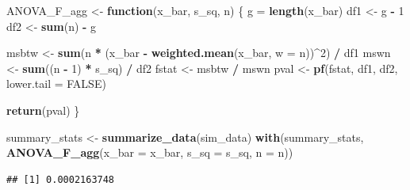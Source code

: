 \documentclass[
]{book}
\newenvironment{Shaded}{\begin{snugshade}}{\end{snugshade}}
\newcommand{\AttributeTok}[1]{\textcolor[rgb]{0.13,0.29,0.53}{#1}}
\newcommand{\ConstantTok}[1]{\textcolor[rgb]{0.56,0.35,0.01}{#1}}
\newcommand{\ControlFlowTok}[1]{\textcolor[rgb]{0.13,0.29,0.53}{\textbf{#1}}}
\newcommand{\DecValTok}[1]{\textcolor[rgb]{0.00,0.00,0.81}{#1}}
\newcommand{\FunctionTok}[1]{\textcolor[rgb]{0.13,0.29,0.53}{\textbf{#1}}}
\newcommand{\NormalTok}[1]{#1}
\newcommand{\OtherTok}[1]{\textcolor[rgb]{0.56,0.35,0.01}{#1}}
\newcommand{\SpecialCharTok}[1]{\textcolor[rgb]{0.81,0.36,0.00}{\textbf{#1}}}
\begin{document}
\begin{Shaded}
\begin{Highlighting}[]
\NormalTok{ANOVA\_F\_agg }\OtherTok{\textless{}{-}} \ControlFlowTok{function}\NormalTok{(x\_bar, s\_sq, n) \{}
\NormalTok{  g }\OtherTok{=} \FunctionTok{length}\NormalTok{(x\_bar)}
\NormalTok{  df1 }\OtherTok{\textless{}{-}}\NormalTok{ g }\SpecialCharTok{{-}} \DecValTok{1}
\NormalTok{  df2 }\OtherTok{\textless{}{-}} \FunctionTok{sum}\NormalTok{(n) }\SpecialCharTok{{-}}\NormalTok{ g}
  
\NormalTok{  msbtw }\OtherTok{\textless{}{-}} \FunctionTok{sum}\NormalTok{(n }\SpecialCharTok{*}\NormalTok{ (x\_bar }\SpecialCharTok{{-}} \FunctionTok{weighted.mean}\NormalTok{(x\_bar, }\AttributeTok{w =}\NormalTok{ n))}\SpecialCharTok{\^{}}\DecValTok{2}\NormalTok{) }\SpecialCharTok{/}\NormalTok{ df1}
\NormalTok{  mswn }\OtherTok{\textless{}{-}} \FunctionTok{sum}\NormalTok{((n }\SpecialCharTok{{-}} \DecValTok{1}\NormalTok{) }\SpecialCharTok{*}\NormalTok{ s\_sq) }\SpecialCharTok{/}\NormalTok{ df2}
\NormalTok{  fstat }\OtherTok{\textless{}{-}}\NormalTok{ msbtw }\SpecialCharTok{/}\NormalTok{ mswn}
\NormalTok{  pval }\OtherTok{\textless{}{-}} \FunctionTok{pf}\NormalTok{(fstat, df1, df2, }\AttributeTok{lower.tail =} \ConstantTok{FALSE}\NormalTok{)}
 
  \FunctionTok{return}\NormalTok{(pval)}
\NormalTok{\}}

\NormalTok{summary\_stats }\OtherTok{\textless{}{-}} \FunctionTok{summarize\_data}\NormalTok{(sim\_data)}
\FunctionTok{with}\NormalTok{(summary\_stats, }\FunctionTok{ANOVA\_F\_agg}\NormalTok{(}\AttributeTok{x\_bar =}\NormalTok{ x\_bar, }\AttributeTok{s\_sq =}\NormalTok{ s\_sq, }\AttributeTok{n =}\NormalTok{ n))}
\end{Highlighting}
\end{Shaded}

\begin{verbatim}
## [1] 0.0002163748
\end{verbatim}
\end{document}
